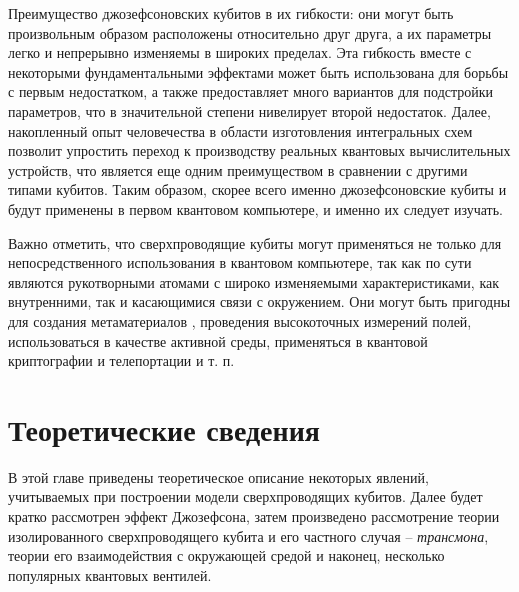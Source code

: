 \documentclass[12pt, twoside]{report}
\numberwithin{equation}{section}
\numberwithin{figure}{section}
\begin{document}
Преимущество джозефсоновских кубитов в их гибкости: они могут быть произвольным образом расположены относительно друг друга, а их параметры легко и непрерывно изменяемы в широких пределах. Эта гибкость вместе с некоторыми фундаментальными эффектами\cite{Koch2007} может быть использована для борьбы с первым недостатком, а также предоставляет много вариантов для подстройки параметров, что в значительной степени нивелирует второй недостаток. Далее, накопленный опыт человечества в области изготовления интегральных схем позволит упростить переход к производству реальных квантовых вычислительных устройств, что является еще одним преимуществом в сравнении с другими типами кубитов. Таким образом, скорее всего именно джозефсоновские кубиты и будут применены в первом квантовом компьютере, и именно их следует изучать.

Важно отметить, что сверхпроводящие кубиты могут применяться не только для непосредственного использования в квантовом компьютере, так как по сути являются рукотворными атомами с широко изменяемыми характеристиками, как внутренними, так и касающимися связи с окружением. Они могут быть пригодны для создания метаматериалов \cite{Macha2014}, проведения высокоточных измерений полей\cite{Clarke2006}, использоваться в качестве активной среды\cite{Astafiev2010}, применяться в квантовой криптографии и телепортации \cite{Xia2014} и т. п. 
\newpage



\chapter{Теоретические сведения} \label{chap:theory}
В этой главе приведены теоретическое описание некоторых явлений, учитываемых при построении модели сверхпроводящих кубитов. Далее будет кратко рассмотрен эффект Джозефсона, затем произведено рассмотрение теории изолированного сверхпроводящего кубита и его частного случая -- \textit{трансмона}, теории его взаимодействия с окружающей средой и наконец, несколько популярных квантовых вентилей. 

\iffalse
\end{document}
